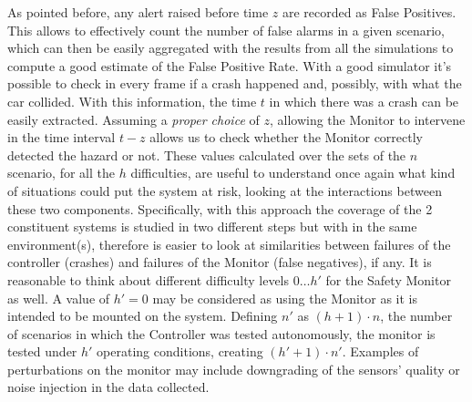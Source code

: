 As pointed before, any alert raised before time $z$ are recorded as False Positives. This allows to effectively count the number of false alarms in a given scenario, which can then be easily aggregated with the results from all the simulations to compute a good estimate of the False Positive Rate.\newline
With a good simulator it's possible to check in every frame if a crash happened and, possibly, with what the car collided. With this information, the time $t$ in which there was a crash can be easily extracted. Assuming a \textsl{proper choice} of $z$, allowing the Monitor to intervene in the time interval $t-z$ allows us to check whether the Monitor correctly detected the hazard or not.\newline
These values calculated over the sets of the $n$ scenario, for all the $h$ difficulties, are useful to understand once again what kind of situations could put the system at risk, looking at the interactions between these two components. Specifically, with this approach the coverage of the 2 constituent systems is studied in two different steps but with in the same environment(s), therefore is easier to look at similarities between failures of the controller (crashes) and failures of the Monitor (false negatives), if any.\newline\newline
It is reasonable to think about different difficulty levels $0\dots h'$ for the Safety Monitor as well. A value of $h' = 0$ may be considered as using the Monitor as it is intended to be mounted on the system. Defining $n'$ as $(h+1)\cdot n$, the number of scenarios in which the Controller was tested autonomously, the monitor is tested under $h'$ operating conditions, creating $(h' + 1) \cdot n'$. Examples of perturbations on the monitor may include downgrading of the sensors' quality or noise injection in the data collected.\newline\newline
